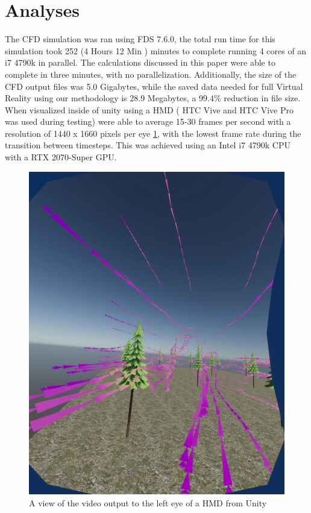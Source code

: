 \section{Analyses}
The CFD simulation was ran  using FDS 7.6.0, the total run time for this simulation took 252 (4 Hours 12 Min ) minutes to complete running 4 cores of an i7 4790k in parallel. 
The calculations discussed in this paper were able to complete in three minutes, with no parallelization. 
Additionally, the size of the CFD output files was 5.0 Gigabytes, while the saved data needed for full Virtual Reality using our methodology is 28.9 Megabytes, a 99.4\% reduction in file size. When visualized inside of unity using a HMD ( HTC Vive and HTC Vive Pro was used during testing) were able to average 15-30 frames per second with a resolution of 1440 x 1660 pixels per eye \ref{fig:LeftEye}, with the lowest frame rate during the transition between timesteps. This was achieved using an Intel i7 4790k CPU with a RTX 2070-Super GPU.
\begin{figure}
\centering
\includegraphics[scale=.29]{Figures/lefteye.png}
\decoRule
\caption[Unity View of Simulation]{A view of the video output to the left eye of a HMD from Unity}
\label{fig:LeftEye}
\end{figure}
